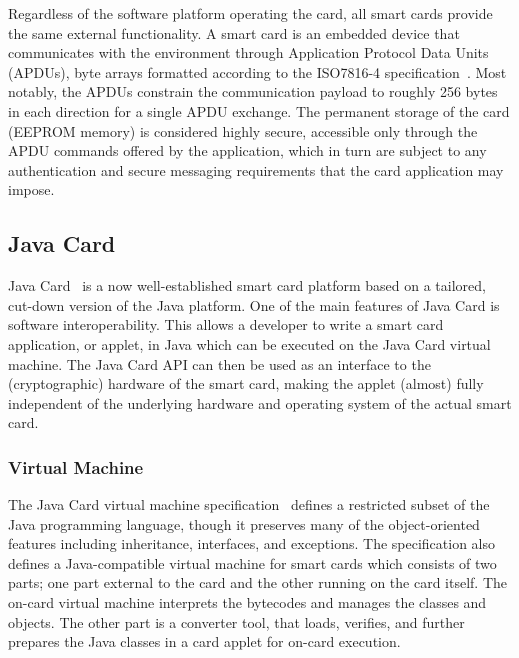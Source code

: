 Regardless of the software platform operating the card, all smart cards provide
the same external functionality. A smart card is an embedded device that
communicates with the environment through Application Protocol Data Units
(APDUs), byte arrays formatted according to the ISO7816-4
specification~\cite{ISO7816_4}. Most notably, the APDUs constrain the
communication payload to roughly 256 bytes in each direction for a single APDU
exchange. The permanent storage of the card (EEPROM memory) is
considered highly secure, accessible only through the APDU commands offered by
the application, which in turn are subject to any authentication
 and secure messaging requirements that the card
application may impose.

\subsection{Java Card}\label{sec:javacard}

Java Card~\cite{Chen00} is a now well-established smart card platform based on
a tailored, cut-down version of the Java platform. One of the main features of
Java Card is software interoperability. This allows a developer to write a smart
card application, or applet, in Java which can be executed on the Java Card virtual machine.
The Java Card API can then be used as an interface to the
(cryptographic) hardware of the smart card, making the applet (almost) fully
independent of the underlying hardware and operating system of the actual smart
card.

\subsubsection{Virtual Machine}

The Java Card virtual machine
specification~\cite{jcvm222} defines a restricted subset of the Java programming
language, though it preserves many of the object-oriented features including
inheritance, interfaces, and exceptions. The specification also defines a
Java-compatible virtual machine for smart cards which consists of two parts; one
part external to the card and the other running on the card itself. The on-card
virtual machine interprets the bytecodes and manages the classes and objects.
The other part is a converter tool, that loads, verifies, and further prepares
the Java classes in a card applet for on-card execution.

